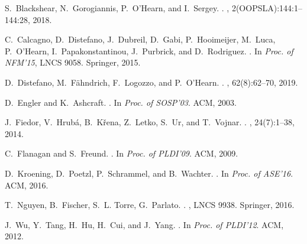 \documentclass[runningheads]{llncs}
\begin{document}
\begin{thebibliography}{1}
\vspace*{-2.5mm}

S.~Blackshear, N.~Gorogiannis, P.~O'Hearn, and I.~Sergey.
.
,
  2(OOPSLA):144:1--144:28, 2018.

C.~Calcagno, D.~Distefano, J.~Dubreil, D.~Gabi, P.~Hooimeijer, M.~Luca,
P.~O'Hearn, I.~Papakonstantinou, J.~Purbrick, and D.~Rodriguez.
.
\newblock In {\em Proc. of NFM'15}, LNCS 9058. Springer, 2015.

D.~Distefano, M.~F\"{a}hndrich, F.~Logozzo, and P.~O'Hearn.
.
, 62(8):62--70, 2019.

D.~Engler and K.~Ashcraft.
.
\newblock In {\em Proc. of SOSP'03}. ACM, 2003.

J.~Fiedor, V.~Hrub\'{a}, B.~K\v{r}ena, Z.~Letko, S.~Ur, and T.~Vojnar.
.
, 24(7):1--38,
  2014.

C.~Flanagan and S.~Freund.
.
\newblock In {\em Proc. of PLDI'09}. ACM, 2009.

D.~Kroening, D.~Poetzl, P.~Schrammel, and B.~Wachter.
.
\newblock In {\em Proc. of ASE'16}. ACM, 2016.

T.~Nguyen, B.~Fischer, S.~L. Torre, G.~Parlato.
.
, LNCS 9938. Springer, 2016.

J.~Wu, Y.~Tang, H.~Hu, H.~Cui, and J.~Yang.
.
\newblock In {\em Proc. of PLDI'12}. ACM, 2012.

\end{thebibliography}


\end{document}
